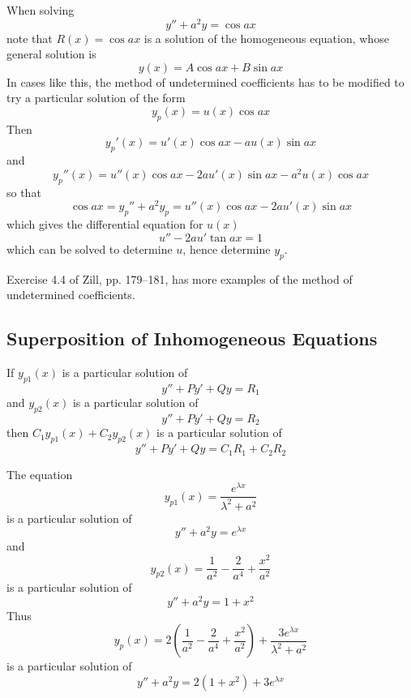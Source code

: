 \begin{example}
When solving 
$$y''+a^2y=\cos ax$$
note that $R(x)=\cos ax$ is a solution of the homogeneous equation, whose
general solution is
$$y(x)=A\cos ax +B\sin ax$$
In cases like this, the method of undetermined coefficients has to be
modified to try a particular solution of the form
$$y_p(x)=u(x)\cos ax$$
Then
$$y_p'(x)=u'(x)\cos ax-au(x)\sin ax$$
and
$$y_p''(x)=u''(x)\cos ax-2au'(x)\sin ax-a^2u(x)\cos ax$$
so that
$$\cos ax=y_p''+a^2y_p=u''(x)\cos ax-2au'(x)\sin ax$$
which gives the differential equation for $u(x)$
$$u''-2au'\tan ax=1$$
which can be solved to determine $u$, hence determine $y_p$.
\end{example}

\begin{exercise}
Exercise 4.4 of Zill, pp. 179--181, has more examples of the method of
undetermined coefficients.
\end{exercise}

\subsection{Superposition of Inhomogeneous Equations}

If $y_{p1}(x)$ is a particular solution of
$$y''+Py'+Qy=R_1$$ 
and $y_{p2}(x)$ is a particular solution of
$$y''+Py'+Qy=R_2$$
then $C_1y_{p1}(x)+C_2y_{p2}(x)$ is a particular solution of
$$y''+Py'+Qy=C_1R_1+C_2R_2$$


\begin{example}
The equation
$$y_{p1}(x)=\frac{e^{\lambda x}}{\lambda^2+a^2}$$
is a particular solution of
$$y''+a^2y=e^{\lambda x}$$
and
$$y_{p2}(x)=\frac{1}{a^2}-\frac{2}{a^4}+\frac{x^2}{a^2}$$
is a particular solution of
$$y''+a^2y=1+x^2$$
Thus
$$y_p(x)=2\left(\frac{1}{a^2}-\frac{2}{a^4}+\frac{x^2}{a^2}\right)+
\frac{3e^{\lambda x}}{\lambda^2+a^2}$$
is a particular solution of
$$y''+a^2y=2(1+x^2)+3e^{\lambda x}$$
\end{example}

